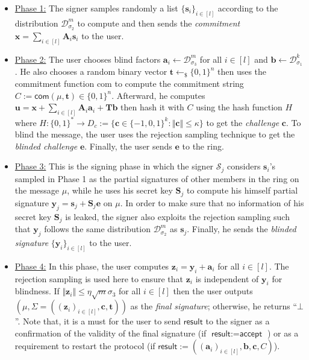 \documentclass[runningheads]{llncs}
\begin{document}
\begin{itemize}
	\begin{itemize}
		\item \underline{Phase 1:} The signer samples randomly a list $\{\mathbf{s}_i \}_{i \in [l]}$ according to the distribution $\mathcal{D}_{\sigma_2}^m$ to compute and then sends the \textit{commitment } $\mathbf{x}=\sum_{i \in [l]}\mathbf{A}_i\mathbf{s}_i$ to the user.
		\item \underline{Phase 2:} The user chooses blind factors $\mathbf{a}_i \leftarrow \mathcal{D}_{\sigma_3}^m$ for all $i \in [l]$ and $\mathbf{b} \leftarrow \mathcal{D}_{\sigma_1}^k$. He also chooses a random binary vector $\mathbf{t}\leftarrow_{\$} \{0,1\}^n$ then uses the commitment function \textsf{com} to compute the commitment string $C:=\mathsf{com}(\mu, \mathbf{t}) \in \{0,1\}^n$. Afterward, he computes $\mathbf{u}=\mathbf{x}+\sum_{i \in [l]}\mathbf{A}_i\mathbf{a}_i +\mathbf{T}\mathbf{b}$ then hash it with $C$ using the hash function $H$ where $H:\{0,1\}^{*} \rightarrow D_c:=\{ \mathbf{c}\in \{-1,0,1\} ^{k}: \Vert \mathbf{c} \Vert \leq \kappa \}$ to get the \textit{challenge} $\mathbf{c}$. To blind the message, the user uses the rejection sampling technique to get the \textit{blinded challenge} $\mathbf{e}$. Finally, the user sends $\mathbf{e}$ to the ring.
		\item \underline{Phase 3:} This is the signing phase in which the signer $ \mathcal{S}_j$ considers $\mathbf{s}_i$'s sampled in Phase 1 as the partial signatures of other members in the ring on the message $\mu$, while he uses his secret key $\mathbf{S}_j$ to compute his himself partial signature $\mathbf{y}_j=\mathbf{s}_j+\mathbf{S}_j \mathbf{e}$  on $\mu$. In order to make sure that no information of his secret key $\mathbf{S}_j$ is leaked, the signer also exploits the rejection sampling such that $\mathbf{y}_j$ follows the same distribution $\mathcal{D}_{\sigma_2}^m$ as $\mathbf{s}_j$. Finally, he sends the \textit{blinded signature}  $\{\mathbf{y}_i\}_{i \in [l]}$ to the user. 
		\item \underline{Phase 4:}  In this phase, the user computes $\mathbf{z}_i=\mathbf{y}_i+\mathbf{a}_i$ for all $i \in [l]$. The rejection sampling is used here to ensure that $\mathbf{z}_i$ is independent of $\mathbf{y}_i$ for blindness.
		 If $\Vert \mathbf{z}_i \Vert \leq \eta \sqrt{m} \sigma_3$ for all $i \in [l]$ then the user outputs $(\mu, \Sigma=((\mathbf{z}_i)_{i \in [l]}, \mathbf{c}, \mathbf{t}))$ as the \textit{final signature}; otherwise, he returns ``$\bot$''. Note that, it is a must for the user to send $\textsf{result}$ to the signer as a confirmation of the validity of the final signature (if $\textsf{result}:=\textsf{accept}$ ) or as a requirement to restart the protocol (if $ \textsf{result}:=((\mathbf{a}_i)_{i\in[l]}, \mathbf{b}, \mathbf{c}, C)$).  

\end{itemize}
\end{itemize}
\end{document}
